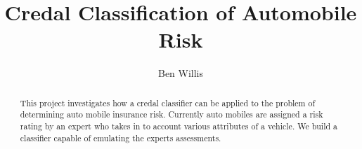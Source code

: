 \documentclass[11pt]{report}
\begin{document}
\title{Credal Classification of Automobile Risk}
\author{Ben Willis}
\maketitle

\begin{abstract}
	This project investigates how a credal classifier can be applied to the problem of determining auto mobile insurance risk. Currently auto mobiles are assigned a risk rating by an expert who takes in to account various attributes of a vehicle. We build a classifier capable of emulating the experts assessments.
\end{abstract}

\tableofcontents






\end{document}
